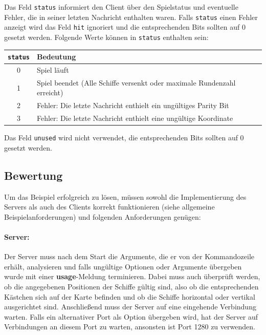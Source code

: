 Das Feld \verb|status| informiert den Client über den Spielstatus und eventuelle Fehler,
die in seiner letzten Nachricht enthalten waren.
Falls \verb|status| einen Fehler anzeigt wird das Feld \verb|hit| ignoriert und die entsprechenden Bits sollten auf 0 gesetzt werden.
Folgende Werte können in \verb|status| enthalten sein:

{\centering
\begin{tabular}{ | c | l | }
\hline
\verb|status| & Bedeutung \\
\hline
0 & Spiel läuft \\
1 & Spiel beendet (Alle Schiffe versenkt oder maximale Rundenzahl erreicht) \\
2 & Fehler: Die letzte Nachricht enthielt ein ungültiges Parity Bit \\
3 & Fehler: Die letzte Nachricht enthielt eine ungültige Koordinate \\
\hline
\end{tabular}\par
}

Das Feld \verb|unused| wird nicht verwendet, die entsprechenden Bits sollten auf 0 gesetzt werden.

\subsection*{Bewertung}
\label{sec:grading}
Um das Beispiel erfolgreich zu lösen, müssen sowohl die Implementierung des
Servers als auch des Clients korrekt funktionieren (siehe allgemeine
Beispielanforderungen) und folgenden Anforderungen genügen:

\paragraph{Server:}

Der Server muss nach dem Start die Argumente, die er von der Kommandozeile erhält, analysieren
und falls ungültige Optionen oder Argumente übergeben wurde mit einer \textbf{usage}-Meldung terminieren.
Dabei muss auch überprüft werden, ob die angegebenen Positionen der Schiffe gültig sind,
also ob die entsprechenden Kästchen sich auf der Karte befinden und ob die Schiffe horizontal oder vertikal ausgerichtet sind.
Anschließend muss der Server auf eine eingehende Verbindung warten.
Falls ein alternativer Port als Option übergeben wird, hat der Server auf Verbindungen an diesem Port zu warten,
ansonsten ist Port 1280 zu verwenden.

